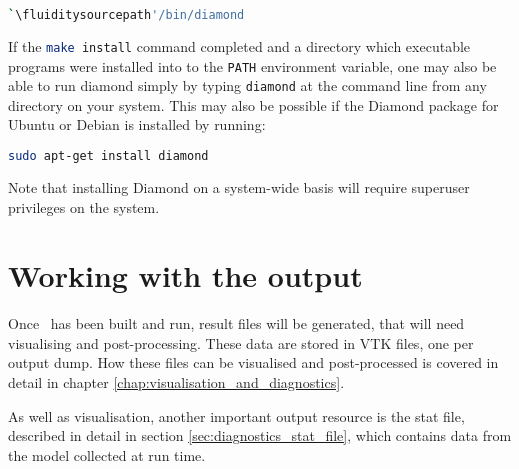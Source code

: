 \begin{lstlisting}[language=Bash]
`\fluiditysourcepath'/bin/diamond
\end{lstlisting}

If the \lstinline[language=Bash]+make install+ command completed and a directory
which executable programs were installed into to the
\lstinline[language=Bash]+PATH+ environment variable, one may also be able to run
diamond simply by typing \lstinline[language=Bash]+diamond+ at the command line
from any directory on your system. This may also be possible if the
Diamond package for Ubuntu or Debian is installed by running:

\begin{lstlisting}[language=Bash]
sudo apt-get install diamond
\end{lstlisting}

Note that installing Diamond on a system-wide basis will require superuser privileges on the system.

\section{Working with the output}
\label{sec:working_with_output}

Once \fluidity\ has been built and run, result files will be generated, that
will need visualising and post-processing. These data are stored in VTK files,
one per output dump.  How these files can be visualised and post-processed is
covered in detail in chapter \ref{chap:visualisation_and_diagnostics}.

As well as visualisation, another important output resource is the stat file,
described in detail in section \ref{sec:diagnostics_stat_file}, which contains
data from the model collected at run time.
